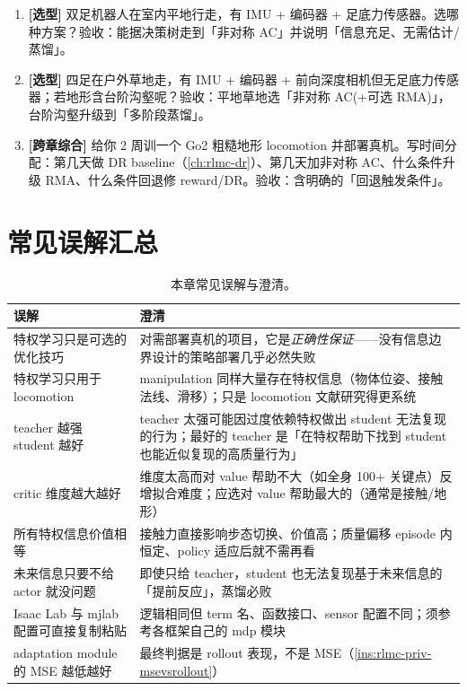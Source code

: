 \begin{practice}[本节练习]
\begin{enumerate}
  \item \textbf{[选型]} 双足机器人在室内平地行走，有 IMU + 编码器 + 足底力传感器。选哪种方案？验收：能据决策树走到「非对称 AC」并说明「信息充足、无需估计/蒸馏」。
  \item \textbf{[选型]} 四足在户外草地走，有 IMU + 编码器 + 前向深度相机但无足底力传感器；若地形含台阶沟壑呢？验收：平地草地选「非对称 AC(+可选 RMA)」，台阶沟壑升级到「多阶段蒸馏」。
  \item \textbf{[跨章综合]} 给你 2 周训一个 Go2 粗糙地形 locomotion 并部署真机。写时间分配：第几天做 DR baseline（\cref{ch:rlmc-dr}）、第几天加非对称 AC、什么条件升级 RMA、什么条件回退修 reward/DR。验收：含明确的「回退触发条件」。
\end{enumerate}
\end{practice}

\section*{常见误解汇总}
\label{sec:rlmc-priv-faq}

\begin{table}[H]
\centering
\small
\caption{本章常见误解与澄清。}
\label{tab:rlmc-priv-misconc}
\begin{tabular}{@{}p{5.6cm}p{7.2cm}@{}}
\toprule
误解 & 澄清 \\
\midrule
特权学习只是可选的优化技巧 & 对需部署真机的项目，它是\emph{正确性保证}——没有信息边界设计的策略部署几乎必然失败 \\
特权学习只用于 locomotion & manipulation 同样大量存在特权信息（物体位姿、接触法线、滑移）；只是 locomotion 文献研究得更系统 \\
teacher 越强 student 越好 & teacher 太强可能因过度依赖特权做出 student 无法复现的行为；最好的 teacher 是「在特权帮助下找到 student 也能近似复现的高质量行为」 \\
critic 维度越大越好 & 维度太高而对 value 帮助不大（如全身 100+ 关键点）反增拟合难度；应选对 value 帮助最大的（通常是接触/地形） \\
所有特权信息价值相等 & 接触力直接影响步态切换、价值高；质量偏移 episode 内恒定、policy 适应后就不需再看 \\
未来信息只要不给 actor 就没问题 & 即使只给 teacher，student 也无法复现基于未来信息的「提前反应」，蒸馏必败 \\
Isaac Lab 与 mjlab 配置可直接复制粘贴 & 逻辑相同但 term 名、函数接口、sensor 配置不同；须参考各框架自己的 mdp 模块 \\
adaptation module 的 MSE 越低越好 & 最终判据是 rollout 表现，不是 MSE（\cref{ins:rlmc-priv-msevsrollout}） \\
\bottomrule
\end{tabular}
\end{table}

